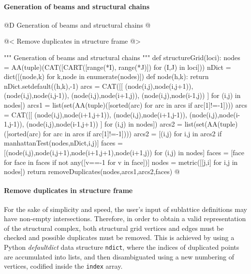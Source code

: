 \documentclass[11pt,oneside]{article}    %
\begin{document}
\paragraph{Generation of beams and structural chains}
@D Generation of beams and structural chains @{
@< Remove duplicates in structure frame @>

""" Generation of beams and structural chains """
def structureGrid(loci):
    nodes = AA(tuple)(CAT([CART([range(*I), range(*J)]) for (I,J) in loci]))
    nDict = dict([(node,k) for k,node in enumerate(nodes)])
    def node(h,k): return nDict.setdefault((h,k),-1)
    arcs = CAT([[ (node(i,j),node(i,j+1)), (node(i,j),node(i,j-1)),
        (node(i,j),node(i+1,j)), (node(i,j),node(i-1,j)) ] for (i,j) in nodes])
    arcs1 = list(set(AA(tuple)([sorted(arc) for arc in arcs if arc[1]!=-1])))
    arcs = CAT([[ (node(i,j),node(i+1,j+1)), (node(i,j),node(i+1,j-1)),
        (node(i,j),node(i-1,j-1)), (node(i,j),node(i-1,j+1)) ] for (i,j) in nodes])
    arcs2 = list(set(AA(tuple)([sorted(arc) for arc in arcs if arc[1]!=-1])))
    arcs2 = [(i,j) for i,j in arcs2 if manhattanTest(nodes,nDict,i,j)]
    faces = [(node(i,j),node(i,j+1),node(i+1,j+1),node(i+1,j)) for (i,j) in nodes]
    faces = [face for face in faces if not any([v==-1 for v in face])]
    nodes = metric([[j,i] for i,j in nodes])
    return removeDuplicates(nodes,arcs1,arcs2,faces)
@}


\paragraph{Remove duplicates in structure frame}

For the sake of simplicity and speed, the user's input of sublattice definitions may have non-empty intersections. Therefore, in order to obtain a valid representation of the structural complex, both structural grid vertices and edges must be checked and possible duplicates must be removed. This is achieved by using a Python \emph{defaultdict} data structure \texttt{ndict}, where the indices of duplicated points are accumulated into lists, and then disambiguated using a new numbering of  vertices, codified inside the \texttt{index} array.
\end{document}
